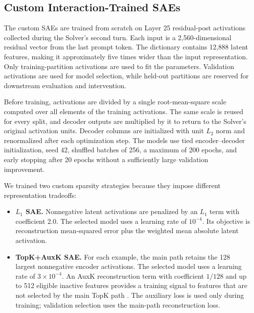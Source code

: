 \subsection{Custom Interaction-Trained SAEs}

The custom SAEs are trained from scratch on Layer 25 residual-post activations
collected during the Solver's second turn. Each input is a
2,560-dimensional residual vector from the last prompt token. The dictionary
contains 12,888 latent features, making it approximately five times wider than
the input representation. Only training-partition activations are used to fit
the parameters. Validation activations are used for model selection, while
held-out partitions are reserved for downstream evaluation and intervention.

Before training, activations are divided by a single root-mean-square scale
computed over all elements of the training activations. The same scale is
reused for every split, and decoder outputs are multiplied by it to return to
the Solver's original activation units. Decoder columns are initialized with
unit $L_2$ norm and renormalized after each optimization step. The models use
tied encoder--decoder initialization, seed 42, shuffled batches of 256, a
maximum of 200 epochs, and early stopping after 20 epochs without a sufficiently
large validation improvement.

We trained two custom sparsity strategies because they impose different
representation tradeoffs:

\begin{itemize}
    \item \textbf{$L_1$ SAE.} Nonnegative latent activations are penalized by
    an $L_1$ term with coefficient 2.0. The selected model uses a learning rate
    of $10^{-4}$. Its objective is reconstruction mean-squared error plus the
    weighted mean absolute latent activation.

    \item \textbf{TopK+AuxK SAE.} For each example, the main path retains the
    128 largest nonnegative encoder activations. The selected model uses a
    learning rate of $3\times10^{-4}$. An AuxK reconstruction term with
    coefficient $1/128$ and up to 512 eligible inactive features provides a
    training signal to features that are not selected by the main TopK path
    \cite{gao2025scaling}. The auxiliary loss is used only during training;
    validation selection uses the main-path reconstruction loss.
\end{itemize}


